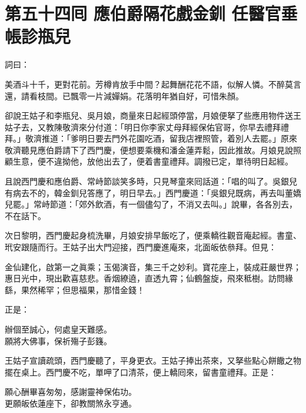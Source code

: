 
\chapter*{第五十四囘 應伯爵隔花戲金釧 任醫官垂帳診瓶兒}


詞曰：

\begin{myquote}
美酒斗十千，更對花前。芳樽肯放手中間？起舞酬花花不語，似解人憐。不醉莫言還，請看枝間。已飄零一片減嬋娟。花落明年猶自好，可惜朱顏。

\end{myquote}

卻說王姑子和李瓶兒、吳月娘，商量來日起經頭停當，月娘便拏了些應用物件送王姑子去，又教陳敬濟來分付道：「明日你李家丈母拜經保佑官哥，你早去禮拜禮拜。」敬濟推道：「爹明日要去門外花園吃酒，留我店裡照管，着別人去罷。」原來敬濟聽見應伯爵請下了西門慶，便想要乘機和潘金蓮弄鬆，因此推故。月娘見說照顧生意，便不違拗他，放他出去了，便着書童禮拜。調撥已定，單待明日起經。

且說西門慶和應伯爵、常峙節談笑多時，只見琴童來囘話道：「唱的叫了。吳銀兒有病去不的，韓金釧兒答應了，明日早去。」西門慶道：「吳銀兒既病，再去叫董嬌兒罷。」常峙節道：「郊外飲酒，有一個儘勾了，不消又去叫。」說畢，各各別去，不在話下。

次日黎明，西門慶起身梳洗畢，月娘安排早飯吃了，便乘轎徃觀音庵起經。書童、玳安跟隨而行。王姑子出大門迎接，西門慶進庵來，北面皈依叅拜。但見：

\begin{myquote}
金仙建化，啟第一之眞乘；玉偈演音，集三千之妙利。寶花座上，裝成莊嚴世界；惠日光中，現出歡喜慈悲。香烟繚遶，直透九霄；仙鶴盤旋，飛來秪樹。訪問緣繇，果然稀罕；但思福果，那惜金錢！
\end{myquote}

正是：

\begin{myquote}
辦個至誠心，何處皇天難感。\\願將大佛事，保祈殤子彭籛。
\end{myquote}

王姑子宣讀疏頭，西門慶聽了，平身更衣。王姑子捧出茶來，又拏些點心餅饊之物擺在桌上。西門慶不吃，單呷了口清茶，便上轎囘來，留書童禮拜。正是：

\begin{myquote}
願心酬畢喜匆匆，感謝靈神保佑功。\\更願皈依蓮座下，卻教關煞永亨通。
\end{myquote}


